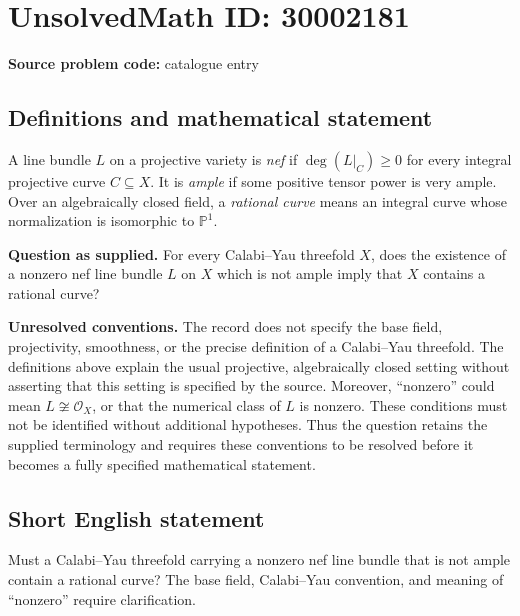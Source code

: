 \documentclass[11pt]{article}
\newcommand{\PP}{\mathbb{P}}
\begin{document}
\section*{UnsolvedMath ID: 30002181}
\textbf{Source problem code:} catalogue entry
\subsection{Definitions and mathematical statement}
A line bundle \(L\) on a projective variety is \emph{nef} if \(\deg(L|_C)\geq 0\) for every integral projective curve \(C\subseteq X\). It is \emph{ample} if some positive tensor power is very ample. Over an algebraically closed field, a \emph{rational curve} means an integral curve whose normalization is isomorphic to \(\PP^1\).

\textbf{Question as supplied.} For every Calabi--Yau threefold \(X\), does the existence of a nonzero nef line bundle \(L\) on \(X\) which is not ample imply that \(X\) contains a rational curve?

\textbf{Unresolved conventions.} The record does not specify the base field, projectivity, smoothness, or the precise definition of a Calabi--Yau threefold. The definitions above explain the usual projective, algebraically closed setting without asserting that this setting is specified by the source. Moreover, ``nonzero'' could mean \(L\not\cong\mathcal O_X\), or that the numerical class of \(L\) is nonzero. These conditions must not be identified without additional hypotheses. Thus the question retains the supplied terminology and requires these conventions to be resolved before it becomes a fully specified mathematical statement.
\subsection{Short English statement}
Must a Calabi--Yau threefold carrying a nonzero nef line bundle that is not ample contain a rational curve? The base field, Calabi--Yau convention, and meaning of ``nonzero'' require clarification.
\end{document}
